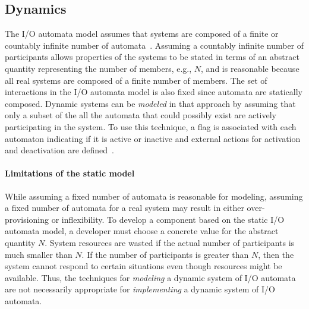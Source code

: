 

\subsection{Dynamics\label{dynamics}}

The I/O automata model assumes that systems are composed of a finite or countably infinite number of automata~\cite{lynch1996distributed}.
Assuming a countably infinite number of participants allows properties of the systems to be stated in terms of an abstract quantity representing the number of members, e.g., $N$, and is reasonable because all real systems are composed of a finite number of members.
The set of interactions in the I/O automata model is also fixed since automata are statically composed.
Dynamic systems can be \emph{modeled} in that approach by assuming that only a subset of the all the automata that could possibly exist are actively participating in the system.
To use this technique, a flag is associated with each automaton indicating if it is active or inactive and external actions for activation and deactivation are defined~\cite{lynch1994atomic}.

\paragraph*{Limitations of the static model}
While assuming a fixed number of automata is reasonable for modeling, assuming a fixed number of automata for a real system may result in either over-provisioning or inflexibility.
To develop a component based on the static I/O automata model, a developer must choose a concrete value for the abstract quantity $N$.
System resources are wasted if the actual number of participants is much smaller than $N$.
If the number of participants is greater than $N$, then the system cannot respond to certain situations even though resources might be available.
Thus, the techniques for \emph{modeling} a dynamic system of I/O automata are not necessarily appropriate for \emph{implementing} a dynamic system of I/O automata.

